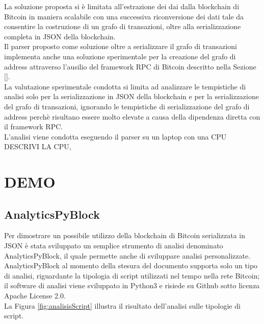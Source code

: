 La soluzione proposta si è limitata all'estrazione dei dai dalla blockchain di Bitcoin in maniera scalabile con una successiva riconversione dei dati tale da consentire la costruzione di un grafo di transazioni, oltre alla serializzazione completa in JSON della blockchain.\\
Il parser proposto come soluzione oltre a serializzare il grafo di transazioni implementa anche una soluzione sperimentale per la creazione del grafo di address attraverso l'ausilio del framework RPC di Bitcoin descritto nella Sezione \ref{}.\\
La valutazione sperimentale condotta si limita ad analizzare le tempistiche di analisi solo per la serializzazione in JSON della blockchain e per la serializzazione del grafo di transazioni, ignorando le tempistiche di serializzazione del grafo di address perchè risultano essere molto elevate a causa della dipendenza diretta con il framework RPC.\\
L'analisi viene condotta eseguendo il parser su un laptop con una CPU DESCRIVI LA CPU, 


\section{DEMO} \label{sec:solDemo}

\subsection{AnalyticsPyBlock} \label{sec:AnalyticsPyBlock}

Per dimostrare un possibile utilizzo della blockchain di Bitcoin serializzata in JSON è stata sviluppato un semplice strumento di analisi denominato AnalyticsPyBlock, il quale permette anche di sviluppare analisi personalizzate.\\
AnalyticsPyBlock al momento della stesura del documento supporta solo un tipo di analisi, riguardante la tipologia di script utilizzati nel tempo nella rete Bitcoin; il software di analisi viene sviluppato in Python3 e risiede su Github sotto licenza Apache License 2.0.\\
La Figura \ref{fig:analisisScript} illustra il risultato dell'analisi sulle tipologie di script.

